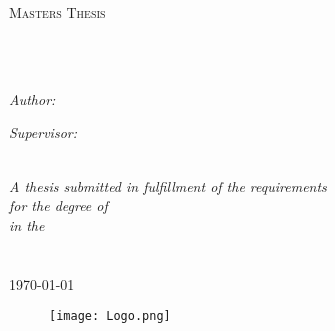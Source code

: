 \documentclass[
11pt, %
english, %
singlespacing, %
liststotoc, %
headsepline, %
]{MastersDoctoralThesis} %
\author{Ryan \textsc{Naidoo}} %
\begin{document}
	
\frontmatter %

\pagestyle{plain} %


\begin{titlepage}
\begin{center}

{\scshape\LARGE \univname\par}\vspace{1.5cm} %
\textsc{\Large Masters Thesis}\\[0.5cm] %

\HRule \\[0.4cm] %
{\huge \bfseries \ttitle\par}\vspace{0.4cm} %
\HRule \\[1.5cm] %
 
\begin{minipage}[t]{0.4\textwidth}
\begin{flushleft} \large
\emph{Author:}\\
\textcolor{magenta}{\authorname} %
\end{flushleft}
\end{minipage}
\begin{minipage}[t]{0.4\textwidth}
\begin{flushright} \large
\emph{Supervisor:} \\
\textcolor{magenta}{\supname} %
\end{flushright}
\end{minipage}\\[2cm]
 
\large \textit{A thesis submitted in fulfillment of the requirements\\ for the degree of \degreename}\\[0.3cm] %
\textit{in the}\\[0.4cm]
\facname\\\deptname\\[1cm] %
 
{\large \today}%
\begin{figure}[!t]
	\centering
	\texttt{[image: Logo.png]} %
\end{figure}

 
\vfill
\end{center}
\end{titlepage}
\end{document}
